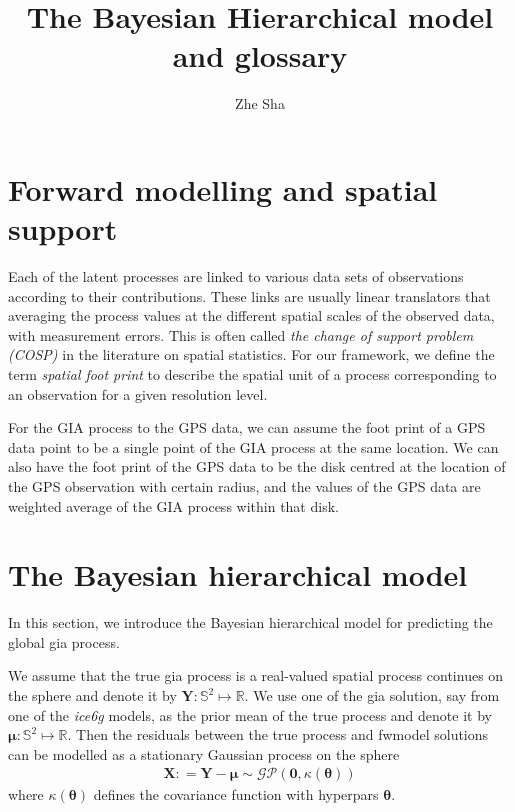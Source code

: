\documentclass[a4paper,12pt]{article}
\begin{document}
 \title{The Bayesian Hierarchical model and glossary}
\author{Zhe Sha}
\maketitle

\onehalfspacing
{}



\section{Forward modelling and spatial support}
Each of the latent processes are linked to various data sets of observations according to their contributions. These links are usually linear translators that averaging the process values at the different spatial scales of the observed data, with measurement errors. This is often called \emph{the change of support problem (COSP)} in the literature on spatial statistics. For our framework, we define the term \emph{spatial foot print} to describe the spatial unit of a process corresponding to an observation for a given resolution level. 

For the GIA process to the GPS data, we can assume the foot print of a GPS data point to be a single point of the GIA process at the same location. We can also have the foot print of the GPS data to be the disk centred at the location of the GPS observation with certain radius, and the values of the GPS data are weighted average of the GIA process within that disk.


\section{The Bayesian hierarchical model}
In this section, we introduce the Bayesian hierarchical model for predicting the global \acrshort{gia} process. 

We assume that the true \acrshort{gia} process is a real-valued spatial process continues on the sphere and denote it by $\bm{Y}: \mathbb{S}^2 \mapsto \mathbb{R}$. We use one of the \acrshort{gia} solution, say from one of the \emph{ice6g} models, as the prior mean of the true process and denote it by $\bm{\mu}: \mathbb{S}^2 \mapsto \mathbb{R}$. Then the residuals between the true process and \gls{fwmodel} solutions can be modelled as a stationary Gaussian process on the sphere 
\begin{align}\label{eq:GIAresid}
 \bm{X}: = \bm{Y} - \bm{\mu} \sim \mathcal{GP}(\bm{0}, \kappa(\bm{\theta}))
\end{align}
where $\kappa(\bm{\theta})$ defines the covariance function with \gls{hyperpars} $\bm{\theta}$.
\end{document}
